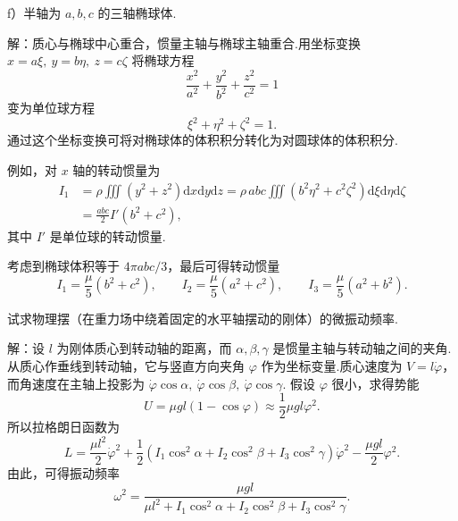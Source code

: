 \begin{xiti}
f）半轴为 $a,b,c$ 的三轴椭球体.

解：质心与椭球中心重合，惯量主轴与椭球主轴重合.用坐标变换 $x=a\xi,\ y=b\eta,\ z=c\zeta$ 将椭球方程
\begin{equation*}
  \frac{x^2}{a^2}+\frac{y^2}{b^2}+\frac{z^2}{c^2}=1
\end{equation*}
变为单位球方程
\begin{equation*}
  \xi^2+\eta^2+\zeta^2=1.
\end{equation*}
通过这个坐标变换可将对椭球体的体积积分转化为对圆球体的体积积分.

例如，对 $x$ 轴的转动惯量为
\begin{equation*}
\begin{aligned}
  I_1&=\rho\iiint\left(y^2+z^2\right)\mathrm{d}x\mathrm{d}y\mathrm{d}z
  =\rho\,abc\iiint\left(b^2\eta^2+c^2\zeta^2\right)\mathrm{d}\xi\mathrm{d}\eta\mathrm{d}\zeta\\
  &=\frac{abc}{2}I'\left(b^2+c^2\right),
\end{aligned}
\end{equation*}
其中 $I'$ 是单位球的转动惯量.

考虑到椭球体积等于 $4\pi abc/3$，最后可得转动惯量
\begin{equation*}
  I_1=\frac{\mu}{5}\left(b^2+c^2\right),\qquad
  I_2=\frac{\mu}{5}\left(a^2+c^2\right),\qquad
  I_3=\frac{\mu}{5}\left(a^2+b^2\right).
\end{equation*}

\quad 试求物理摆（在重力场中绕着固定的水平轴摆动的刚体）的微振动频率.

解：设 $l$ 为刚体质心到转动轴的距离，而 $\alpha,\beta,\gamma$ 是惯量主轴与转动轴之间的夹角.从质心作垂线到转动轴，它与竖直方向夹角 $\varphi$ 作为坐标变量.质心速度为 $V=l\dot{\varphi}$，而角速度在主轴上投影为
$\dot{\varphi}\cos\alpha,\ \dot{\varphi}\cos\beta,\ \dot{\varphi}\cos\gamma$.
假设 $\varphi$ 很小，求得势能
\begin{equation*}
  U=\mu gl(1-\cos\varphi)\approx\frac{1}{2}\mu gl\varphi^2.
\end{equation*}
所以拉格朗日函数为
\begin{equation*}
  L=\frac{\mu l^2}{2}\dot{\varphi}^2
  +\frac{1}{2}\left(I_1\cos^2\alpha+I_2\cos^2\beta+I_3\cos^2\gamma\right)\dot{\varphi}^2
  -\frac{\mu gl}{2}\varphi^2.
\end{equation*}
由此，可得振动频率
\begin{equation*}
  \omega^2=\frac{\mu gl}{\mu l^2+I_1\cos^2\alpha+I_2\cos^2\beta+I_3\cos^2\gamma}.
\end{equation*}


\end{xiti}
